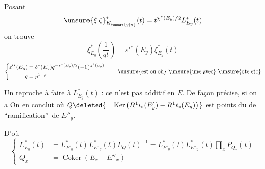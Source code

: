 Posant
\[
 \unsure{\xi|\zeta}^{*}_{E_{\unsure{y|\eta}}}(t)=t^{\chi^*(E_y)/2}L^*_{E_y}(t)
\]
on trouve
\[
 \boxed{\xi^*_{E_y}\left(\frac{1}{qt}\right)=\varepsilon'{}^*(E_y)\xi^*_{E_y}(t)}
\]
\[
 \left\{\begin{aligned}
 \varepsilon'{}^*(E_y)&=\delta^*(E_y)q^{-\chi^*(E_y)/2}(-1)^{\chi^*(E_y)}\\
 q&=p^{1+\rho}
 \end{aligned}\right.
 \qquad\text{\unsure{est|ou|où} \unsure{une|avec} \unsure{cte|etc}}
\]

\uline{Un reproche à faire à} $L^*_{E_y}(t)$ : \uline{ce n'est pas additif} en $E$. De façon précise, si on a
On en  conclut
où $Q\deleted{=\operatorname{Ker}\left(R^1i_*(E'_y)\mathbin{-}R^1i_*(E_y)\right)}$
est    points du  de \textquotedblleft ramification\textquotedblright\ de $E''_y$.

D'où
\[
 \left\{\begin{aligned}
 L^*_{E_y}(t)&=L^*_{E'_y}(t)L^*_{E''_y}(t)L_Q(t)^{-1}
 =L^*_{E'_y}(t)L^*_{E''_y}(t)\prod_x P_{Q_x}(t)\\
 Q_x&=\operatorname{Coker}\left(E_x\mathbin{-}E''_x\right)
 \end{aligned}\right.
\]
